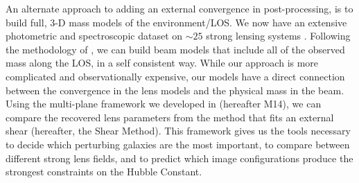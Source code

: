 An alternate approach to adding an external convergence in post-processing, is to build full, 3-D mass models of the environment/LOS.  We now have an extensive photometric and spectroscopic dataset on $\sim25$ strong lensing systems \citep{Momcheva06,Williams08,Wong11,Momcheva15}. Following the methodology of \citet{Wong11}, we can build beam models that include all of the observed mass along the LOS, in a self consistent way.  While our approach is more complicated and observationally expensive, our models have a direct connection between the convergence in the lens models and the physical mass in the beam. Using the multi-plane framework we developed in \citet{McCully14} (hereafter M14), we can compare the recovered lens parameters from the method that fits an external shear (hereafter, the Shear Method). This framework gives us the tools necessary to decide which perturbing galaxies are the most important, to compare between different strong lens fields, and to predict which image configurations produce the strongest constraints on the Hubble Constant.